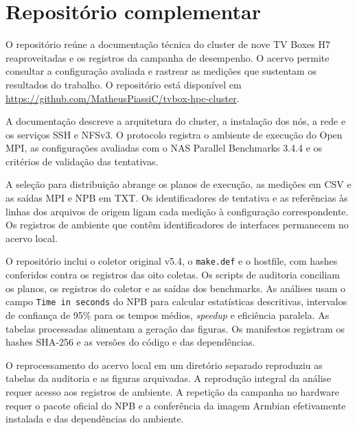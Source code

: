 \chapter{Repositório complementar}
\label{ap:repositorio}

O repositório reúne a documentação técnica do cluster de nove TV Boxes H7
reaproveitadas e os registros da campanha de desempenho. O acervo permite
consultar a configuração avaliada e rastrear as medições que sustentam os
resultados do trabalho. O repositório está disponível em
\url{https://github.com/MatheusPiassiC/tvbox-hpc-cluster}.

A documentação descreve a arquitetura do cluster, a instalação dos nós,
a rede e os serviços SSH e NFSv3. O protocolo registra o ambiente de
execução do Open MPI, as configurações avaliadas com o NAS Parallel
Benchmarks 3.4.4 e os critérios de validação das tentativas.

A seleção para distribuição abrange os planos de execução, as medições
em CSV e as saídas MPI e NPB em TXT. Os identificadores de tentativa e
as referências às linhas dos arquivos de origem ligam cada medição à
configuração correspondente. Os registros de ambiente que contêm
identificadores de interfaces permanecem no acervo local.

O repositório inclui o coletor original v5.4, o \texttt{make.def} e o
hostfile, com hashes conferidos contra os registros das oito coletas.
Os scripts de auditoria conciliam os planos, os registros do coletor e as
saídas dos benchmarks. As análises usam o campo \texttt{Time in seconds}
do NPB para calcular estatísticas descritivas, intervalos de confiança de
95\% para os tempos médios, \emph{speedup} e eficiência paralela. As
tabelas processadas alimentam a geração das figuras. Os manifestos
registram os hashes SHA-256 e as versões do código e das dependências.

O reprocessamento do acervo local em um diretório separado reproduziu as
tabelas da auditoria e as figuras arquivadas. A reprodução integral da
análise requer acesso aos registros de ambiente. A repetição da campanha
no hardware requer o pacote oficial do NPB e a conferência da imagem
Armbian efetivamente instalada e das dependências do ambiente.

